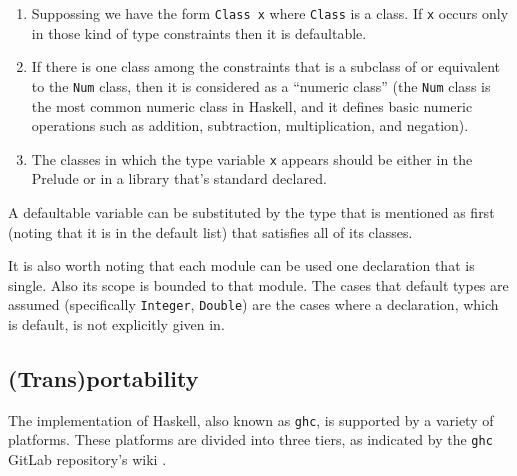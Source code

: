 \documentclass[a4paper, titlepage, twoside]{article}
\begin{document}
\begin{enumerate}
\item Suppossing we have the form \texttt{Class x} where \texttt{Class} is a class. If \texttt{x} occurs only in those kind of type constraints then it is defaultable.
\item If there is one class among the constraints that is a subclass of or equivalent to the \texttt{Num} class, then it is considered as a ``numeric class'' (the \texttt{Num} class is the most common numeric class in Haskell, and it defines basic numeric operations such as addition, subtraction, multiplication, and negation).
\item The classes in which the type variable \texttt{x} appears should be either in the Prelude or in a library that's standard declared.
\end{enumerate}

A defaultable variable can be substituted by the type that is mentioned as first (noting that it is in the default list) that satisfies all of its classes.

It is also worth noting that each module can be used one declaration that is single. Also its scope is bounded to that module. The cases that default types are assumed (specifically \texttt{Integer}, \texttt{Double}) are the cases where a declaration, which is default, is not explicitly given in.

\subsection{(Trans)portability}
\label{sec:orgdff3b5e}

The implementation of Haskell, also known as \texttt{ghc}, is supported by a variety of platforms. These platforms are divided into three tiers, as indicated by the \texttt{ghc} GitLab repository's wiki \autocite{gamariPlatformsGlasgowHaskell2023}.
\end{document}
